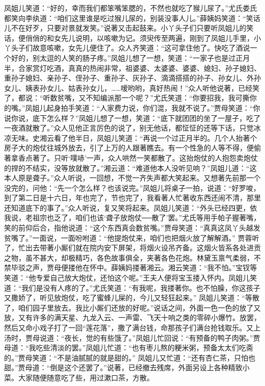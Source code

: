 \begin{parag}
    凤姐儿笑道：“好的，幸而我们都笨嘴笨腮的，不然也就吃了猴儿尿了。”尤氏娄氏都笑向李纨道：“咱们这里谁是吃过猴儿尿的，别装没事人儿。”薛姨妈笑道：“笑话儿不在好歹，只要对景就发笑。”说著又击起鼓来。小丫头子们只要听凤姐儿的笑话，便俏俏的和女先儿说明，以咳嗽为记。须臾传至两遍，刚到了凤姐儿手里，小丫头子们故意咳嗽，女先儿便住了。众人齐笑道：“这可拿住他了。快吃了酒说一个好的，别太逗的人笑的肠子疼。”凤姐儿想了一想，笑道：“一家子也是过正月半，合家赏灯吃酒，真真的热闹非常，祖婆婆、太婆婆、婆婆、媳妇、孙子媳妇、重孙子媳妇、亲孙子、侄孙子、重孙子、灰孙子、滴滴搭搭的孙子、孙女儿、外孙女儿、姨表孙女儿、姑表孙女儿，……嗳哟哟，真好热闹！”众人听他说著，已经笑了，都说：“听数贫嘴，又不知编派那一个呢？”尤氏笑道：“你要招我，我可撕你的嘴。”凤姐儿起身拍手笑道：“人家费力说，你们混，我就不说了。”贾母笑道：“你说你说，底下怎么样？”凤姐儿想了一想，笑道：“底下就团团的坐了一屋子，吃了一夜酒就散了。”众人见他正言厉色的说了，别无他话，都怔怔的还等下话，只觉冰凉无味。史湘云看了他半日，凤姐儿笑道：“再说一个过正月半的。几个人抬著个房子大的炮仗往城外放去，引了上万的人跟著瞧去。有一个性急的人等不得，便偷著拿香点著了。只听‘噗哧’一声，众人哄然一笑都散了。这抬炮仗的人抱怨卖炮仗的捍的不结实，没等放就散了。”湘云道：“难道他本人没听见响？”凤姐儿道：“这本人原是聋子。”众人听说，一回想，不觉一齐失声都大笑起来。又想著先前那一个没完的，问他：“先一个怎么样？也该说完。”凤姐儿将桌子一拍，说道：“好罗唆，到了第二日是十六日，年也完了，节也完了，我看著人忙著收东西还闹不清，那里还知道底下的事了。”众人听说，复又笑将起来。凤姐儿笑道：“外头已经四更，依我说，老祖宗也乏了，咱们也该‘聋子放炮仗──散了’罢。”尤氏等用手帕子握著嘴，笑的前仰后合，指他说道：“这个东西真会数贫嘴。”贾母笑道：“真真这凤丫头越发贫嘴了。”一面说，一面吩咐道：“他提炮仗来，咱们也把烟火放了解解酒。” 贾蓉听了，忙出去带著小厮们就在院内安下屏架，将烟火设吊齐备。这烟火皆系各处进贡之物，虽不甚大，却极精巧，各色故事俱全，夹著各色花炮。林黛玉禀气柔弱，不禁毕驳之声，贾母便搂他在怀中。薛姨妈搂著湘云。湘云笑道：“我不怕。”宝钗等笑道：“他专爱自己放大炮仗，还怕这个呢。”王夫人便将宝玉搂入怀内。凤姐儿笑道：“我们是没有人疼的了。”尤氏笑道：“有我呢，我搂著你。也不怕臊，你这孩子又撒娇了，听见放炮仗，吃了蜜蜂儿屎的，今儿又轻狂起来。” 凤姐儿笑道：“等散了，咱们园子里放去。我比小厮们还放的好呢。”说话之间，外面一色一色的放了又放，又有许多的满天星、九龙入云、一声雷、飞天十响之类的零碎小爆竹。放罢，然后又命小戏子打了一回“莲花落”，撒了满台钱，命那孩子们满台抢钱取乐。又上汤时，贾母说道：“夜长，觉的有些饿了。”凤姐儿忙回说：“有预备的鸭子肉粥。”贾母道：“我吃些清淡的罢。”凤姐儿忙道：“也有枣儿熬的粳米粥，预备太太们吃斋的。”贾母笑道：“不是油腻腻的就是甜的。” 凤姐儿又忙道：“还有杏仁茶，只怕也甜。”贾母道：“倒是这个还罢了。”说著，已经撤去残席，外面另设上各种精致小菜。大家随便随意吃了些，用过漱口茶，方散。
\end{parag}


